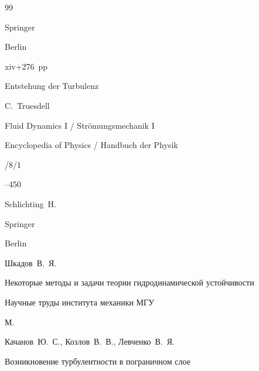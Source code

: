 \begin{thebibliography}{99}

\publ Springer

\publaddr Berlin

\totalpages xiv+276~pp \nofrills







\paper Entstehung der Turbulenz


\ed C.~Truesdell  

\inbook Fluid Dynamics I / Strömungsmechanik I

\serial  Encyclopedia of Physics / Handbuch der Physik

/8/1

--450

\by Schlichting~H. 


\publ Springer

\publaddr Berlin




\by Шкадов~В.~Я.

\paper Некоторые методы и задачи теории гидродинамической устойчивости


\serial  Научные труды института механики МГУ


\publaddr М.
















\by Качанов~Ю.~С., Козлов~В.~В., Левченко~В.~Я.

\book Возникновение турбулентности в пограничном слое


\end{thebibliography}
